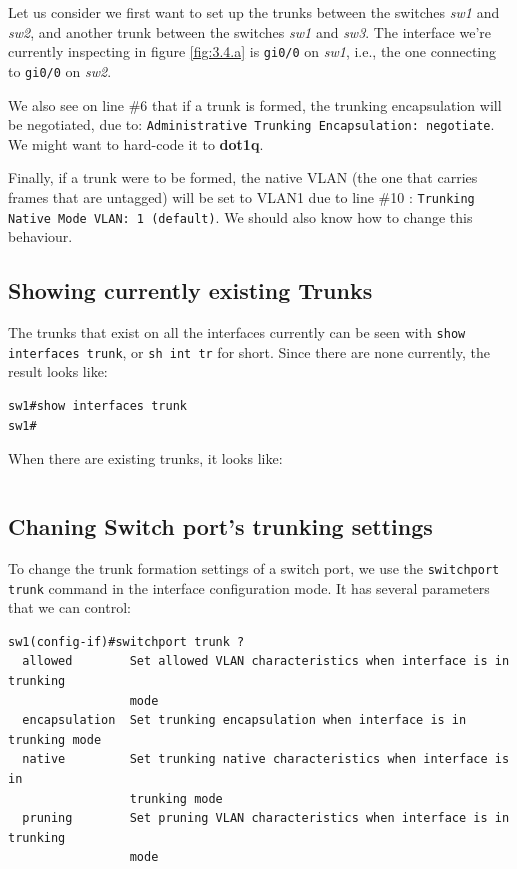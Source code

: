 \noindent
Let us consider we first want to set up the trunks between the switches \textit{sw1} and \textit{sw2}, and another trunk between the switches \textit{sw1} and \textit{sw3}. The interface we're currently inspecting in figure \ref{fig:3.4.a} is \verb|gi0/0| on \textit{sw1}, i.e., the one connecting to \verb|gi0/0| on \textit{sw2}. 

We also see on line \#6 that if a trunk is formed, the trunking encapsulation will be negotiated, due to: \verb|Administrative Trunking Encapsulation: negotiate|. We might want to hard-code it to \textbf{dot1q}. 

Finally, if a trunk were to be formed, the native VLAN (the one that carries frames that are untagged) will be set to VLAN1 due to line \#10 : \verb|Trunking Native Mode VLAN: 1 (default)|. We should also know how to change this behaviour. 

\subsection{Showing currently existing Trunks}
The trunks that exist on all the interfaces currently can be seen with \verb|show interfaces trunk|, or \verb|sh int tr| for short. Since there are none currently, the result looks like: 

\vspace{-15pt}
\begin{verbatim}
sw1#show interfaces trunk
sw1#
\end{verbatim}
\vspace{-10pt}

\noindent
When there are existing trunks, it looks like:

\vspace{-15pt}
\begin{verbatim}

\end{verbatim}

\subsection{Chaning Switch port's trunking settings}
To change the trunk formation settings of a switch port, we use the \verb|switchport trunk| command in the interface configuration mode. It has several parameters that we can control: 

\vspace{-15pt}
\begin{verbatim}
sw1(config-if)#switchport trunk ?
  allowed        Set allowed VLAN characteristics when interface is in trunking
                 mode
  encapsulation  Set trunking encapsulation when interface is in trunking mode
  native         Set trunking native characteristics when interface is in
                 trunking mode
  pruning        Set pruning VLAN characteristics when interface is in trunking
                 mode
\end{verbatim}
\vspace{-10pt}

